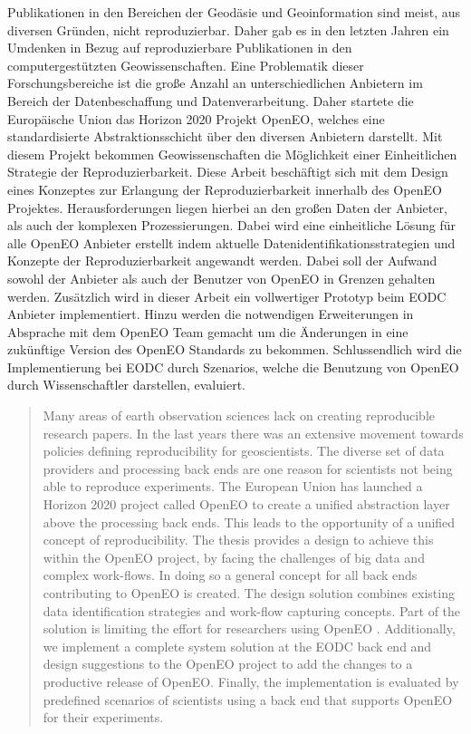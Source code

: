 \documentclass[draft,final]{vutinfth} %
\begin{document}
\begin{kurzfassung}
Publikationen in den Bereichen der Geodäsie und Geoinformation sind meist, aus diversen Gründen, nicht reproduzierbar. Daher gab es in den letzten Jahren ein Umdenken in Bezug auf reproduzierbare Publikationen in den computergestützten Geowissenschaften. Eine Problematik dieser Forschungsbereiche ist die große Anzahl an unterschiedlichen Anbietern im Bereich der Datenbeschaffung und Datenverarbeitung. Daher startete die Europäische Union das Horizon 2020 Projekt OpenEO, welches eine standardisierte Abstraktionsschicht über den diversen Anbietern darstellt. Mit diesem Projekt bekommen Geowissenschaften die Möglichkeit einer Einheitlichen Strategie der Reproduzierbarkeit. Diese Arbeit beschäftigt sich mit dem Design eines Konzeptes zur Erlangung der Reproduzierbarkeit innerhalb des OpenEO Projektes. Herausforderungen liegen hierbei an den großen Daten der Anbieter, als auch der komplexen Prozessierungen. Dabei wird eine einheitliche Lösung für alle OpenEO Anbieter erstellt indem aktuelle Datenidentifikationsstrategien und Konzepte der Reproduzierbarkeit angewandt werden. Dabei soll der Aufwand sowohl der Anbieter als auch der Benutzer von OpenEO in Grenzen gehalten werden. Zusätzlich wird in dieser Arbeit ein vollwertiger Prototyp beim EODC Anbieter implementiert. Hinzu werden die notwendigen Erweiterungen in Absprache mit dem OpenEO Team gemacht um die Änderungen in eine zukünftige Version des OpenEO Standards zu bekommen. Schlussendlich wird die Implementierung bei EODC durch Szenarios, welche die Benutzung von OpenEO durch Wissenschaftler darstellen, evaluiert.        
\end{kurzfassung}

\begin{abstract}
Many areas of earth observation sciences lack on creating reproducible research papers. In the last years there was an extensive movement towards policies defining reproducibility for geoscientists. The diverse set of data providers and processing back ends are one reason for scientists not being able to reproduce experiments. The European Union has launched a Horizon 2020 project called OpenEO to create a unified abstraction layer above the processing back ends. This leads to the opportunity of a unified concept of reproducibility. The thesis provides a design to achieve this within the OpenEO project, by facing the challenges of big data and complex work-flows. In doing so a general concept for all back ends contributing to OpenEO is created. The design solution combines existing data identification strategies and work-flow capturing concepts. Part of the solution is limiting the effort for researchers using OpenEO . Additionally, we implement a complete system solution at the EODC back end and design suggestions to the OpenEO project to add the changes to a productive release of OpenEO. Finally, the implementation is evaluated by predefined scenarios of scientists using a back end that supports OpenEO for their experiments.    
\end{abstract}
\end{document}
